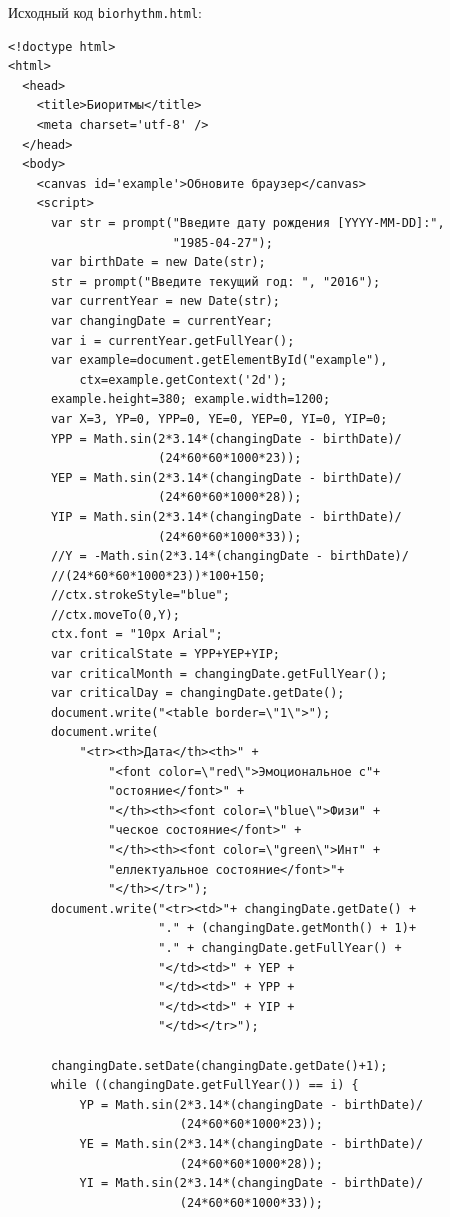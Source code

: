 Исходный код \verb|biorhythm.html|:

\begin{verbatim}
<!doctype html>
<html>
  <head>
    <title>Биоритмы</title>
    <meta charset='utf-8' />
  </head>
  <body>
    <canvas id='example'>Обновите браузер</canvas>
    <script>
      var str = prompt("Введите дату рождения [YYYY-MM-DD]:",
                       "1985-04-27");
      var birthDate = new Date(str);
      str = prompt("Введите текущий год: ", "2016");
      var currentYear = new Date(str);
      var changingDate = currentYear;
      var i = currentYear.getFullYear();
      var example=document.getElementById("example"),
          ctx=example.getContext('2d');
      example.height=380; example.width=1200;
      var X=3, YP=0, YPP=0, YE=0, YEP=0, YI=0, YIP=0;
      YPP = Math.sin(2*3.14*(changingDate - birthDate)/
                     (24*60*60*1000*23));
      YEP = Math.sin(2*3.14*(changingDate - birthDate)/
                     (24*60*60*1000*28));
      YIP = Math.sin(2*3.14*(changingDate - birthDate)/
                     (24*60*60*1000*33));
      //Y = -Math.sin(2*3.14*(changingDate - birthDate)/
      //(24*60*60*1000*23))*100+150;
      //ctx.strokeStyle="blue";
      //ctx.moveTo(0,Y);
      ctx.font = "10px Arial";
      var criticalState = YPP+YEP+YIP;
      var criticalMonth = changingDate.getFullYear();
      var criticalDay = changingDate.getDate();
      document.write("<table border=\"1\">");
      document.write(
          "<tr><th>Дата</th><th>" +
              "<font color=\"red\">Эмоциональное с"+
              "остояние</font>" +
              "</th><th><font color=\"blue\">Физи" +
              "ческое состояние</font>" +
              "</th><th><font color=\"green\">Инт" +
              "еллектуальное состояние</font>"+
              "</th></tr>");
      document.write("<tr><td>"+ changingDate.getDate() +
                     "." + (changingDate.getMonth() + 1)+
                     "." + changingDate.getFullYear() +
                     "</td><td>" + YEP +
                     "</td><td>" + YPP +
                     "</td><td>" + YIP +
                     "</td></tr>");
      
      changingDate.setDate(changingDate.getDate()+1);
      while ((changingDate.getFullYear()) == i) {
          YP = Math.sin(2*3.14*(changingDate - birthDate)/
                        (24*60*60*1000*23));
          YE = Math.sin(2*3.14*(changingDate - birthDate)/
                        (24*60*60*1000*28));
          YI = Math.sin(2*3.14*(changingDate - birthDate)/
                        (24*60*60*1000*33));
          

\end{verbatim}
